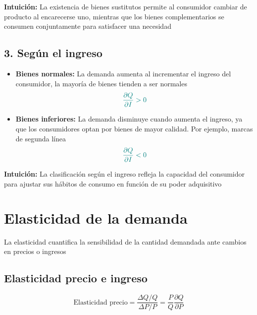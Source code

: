 \documentclass{article}
\begin{document}
\textbf{Intuición:} La existencia de bienes sustitutos permite al consumidor cambiar de producto al encarecerse uno, mientras que los bienes complementarios se consumen conjuntamente para satisfacer una necesidad
\subsection*{3. Según el ingreso}
\begin{itemize}
    \item \textbf{\color{teal}Bienes normales:} La demanda aumenta al incrementar el ingreso del consumidor, la mayoría de bienes tienden a ser normales
    \[\color{teal}
    \frac{\partial Q}{\partial I} > 0
    \]
    
    \item \textbf{\color{teal}Bienes inferiores:} La demanda disminuye cuando aumenta el ingreso, ya que los consumidores optan por bienes de mayor calidad. Por ejemplo, marcas de segunda línea
    \[\color{teal}
    \frac{\partial Q}{\partial I} < 0
    \]
\end{itemize}

\textbf{Intuición:} La clasificación según el ingreso refleja la capacidad del consumidor para ajustar sus hábitos de consumo en función de su poder adquisitivo

\section*{Elasticidad de la demanda}

La elasticidad cuantifica la sensibilidad de la cantidad demandada ante cambios en precios o ingresos

\subsection*{Elasticidad precio e ingreso}
\begin{equation*}
\text{Elasticidad precio} = \frac{\Delta Q/Q}{\Delta P/P} = \frac{P}{Q}\frac{\partial Q}{\partial P}
\end{equation*}
\end{document}
